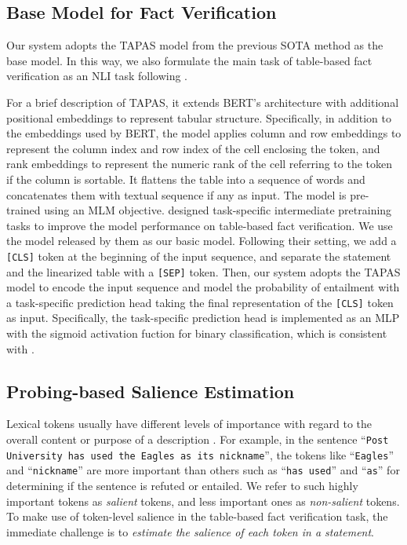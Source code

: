 \documentclass[11pt]{article}
\begin{document}
\subsection{Base Model for Fact Verification}\label{sec:basic_model}


Our system adopts the TAPAS \cite{herzig2020tapas} model from the previous SOTA method as the base model.
In this way, we also formulate the main task of table-based fact verification as an NLI task following \citet{eisenschlos2020understanding}.


For a brief description of TAPAS,
it extends BERT’s architecture \cite{devlin2019bert} with additional positional embeddings to represent tabular structure.
Specifically, in addition to the embeddings used by BERT, the model applies column and row embeddings to represent the column index and row index of the cell enclosing the token, and rank embeddings to represent the numeric rank of the cell referring to the token if the column is sortable.
It flattens the table into a sequence of words and concatenates them with textual sequence if any as input.
The model is pre-trained using an MLM objective.
\citet{eisenschlos2020understanding} designed task-specific intermediate pretraining tasks to improve the model performance on table-based fact verification.
We use the model released by them as our basic model.
Following their setting, we add a \texttt{[CLS]} token at the beginning of the input sequence, and separate the statement and the linearized table with a \texttt{[SEP]} token.
Then, our system adopts the TAPAS model to encode the input sequence and model the probability of entailment with a task-specific prediction head taking the final representation of the \texttt{[CLS]} token as input.
Specifically, the task-specific prediction head is implemented as an MLP with the sigmoid activation fuction for binary classification, which is consistent with \citet{eisenschlos2020understanding}.






\subsection{Probing-based Salience Estimation}\label{sec:salient}
Lexical tokens usually have different levels of importance with regard to the overall content or purpose of a description \cite{chiarcos2011introduction, liu2018automatic, xiong2018towards}.
For example, in the sentence ``\texttt{Post University
has used the Eagles as its nickname}'', the tokens like ``\texttt{Eagles}'' and ``\texttt{nickname}'' are more important than others such as ``\texttt{has used}'' and ``\texttt{as}'' for determining if the sentence is refuted or entailed. 
We refer to such highly important tokens as \textit{salient} tokens, and less important ones as \textit{non-salient} tokens. 
To make use of token-level salience in the table-based fact verification task, the immediate challenge is to \textit{estimate the salience of each token in a statement}.
\end{document}
